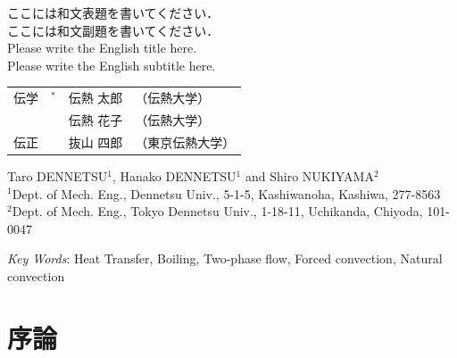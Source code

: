 \documentclass[
    paper=a4paper,      %
    article,            %
    fleqn,              %
    fontsize=10pt,      %
    jafontsize=10pt,    %
    head_space=20mm,    %
    foot_space=25mm,    %
    gutter=20mm,        %
    fore-edge=20mm      %
    ]{jlreq}            %
\begin{document}
\thispagestyle{nhts}

\begin{center}
    \fontsize{14pt}{18pt}\selectfont
    {\gtfamily
    ここには和文表題を書いてください．
    }\\\fontsize{12pt}{14pt}\selectfont
    {\gtfamily
    ここには和文副題を書いてください．
    }\\
    Please write the English title here.
    \\
    Please write the English subtitle here.
    \vskip12pt\fontsize{10pt}{12pt}\selectfont
    \begin{tabular}{lrll}
      伝学  &$^\ast$\hspace{-3mm} &伝熱 太郎  &（伝熱大学）\\
        & &伝熱 花子  &（伝熱大学）\\
      伝正  & &抜山 四郎  &（東京伝熱大学）
    \end{tabular}
    \vskip12pt
    Taro DENNETSU$^1$, Hanako DENNETSU$^1$ and Shiro NUKIYAMA$^2$
    \\
    $^1$Dept. of Mech. Eng., Dennetsu Univ., 5-1-5, Kashiwanoha, Kashiwa, 277-8563 \\
    $^2$Dept. of Mech. Eng., Tokyo Dennetsu Univ., 1-18-11, Uchikanda, Chiyoda, 101-0047
    \vskip12pt
\end{center}
{\setlength{\leftskip}{\leftskip+15truemm}\setlength{\rightskip}{\rightskip+15truemm}%
\lipsum[1-2]
\par}%
\begin{center}
    \vskip12pt
    \textit{Key Words}: 
    Heat Transfer, Boiling, Two-phase flow, Forced convection, Natural convection
    \vskip12pt
\end{center}

\section{序論}

\end{document}
